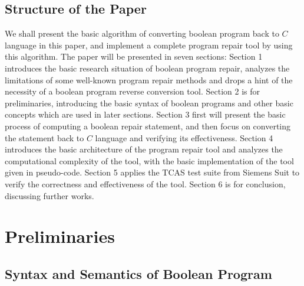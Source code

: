 \documentclass[10pt,journal,final,]{article}
\theoremstyle{definition}
\begin{document}
\subsection{Structure of the Paper}
\label{section:StructureOfThePaper}
We shall present the basic algorithm of converting boolean program back to $C$ language in this paper, and implement a complete program repair tool by using this algorithm.
The paper will be presented in seven sections:
Section 1 introduces the basic research situation of boolean program repair, analyzes the limitations of some well-known program repair methods and drops a hint of the necessity of a boolean program reverse conversion tool.
Section 2 is for preliminaries, introducing the basic syntax of boolean programs and other basic concepts which are used in later sections.
Section 3 first will present the basic process of computing a boolean repair statement, and then focus on converting the statement back to $C$ language and verifying its effectiveness.
Section 4 introduces the basic architecture of the program repair tool and analyzes the computational complexity of the tool, with the basic implementation of the tool given in pseudo-code.
Section 5 applies the TCAS test suite from Siemens Suit to verify the correctness and effectiveness of the tool.
Section 6 is for conclusion, discussing further works.

\section{Preliminaries}
\label{section:Preliminaries}
\subsection{Syntax and Semantics of Boolean Program}
\label{section:SyntaxAndSemanticsOfBooleanProgram}
\end{document}
